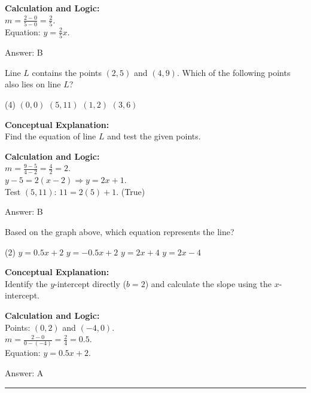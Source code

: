\documentclass[11pt,paper=a4,answers]{exam}
\begin{document}
\begin{questions}
\begin{solution}
\vspace{10pt}
\textbf{Calculation and Logic:} \\
$m = \frac{2 - 0}{5 - 0} = \frac{2}{5}$. \\
Equation: $y = \frac{2}{5}x$.

\vspace{15pt}
Answer: \colorbox{yellow!100}{B}
\end{solution}

\vspace{20pt}

\question
Line $L$ contains the points $(2, 5)$ and $(4, 9)$. Which of the following points also lies on line $L$?
\begin{tasks}(4)
    \task $(0, 0)$
    \task $(5, 11)$
    \task $(1, 2)$
    \task $(3, 6)$
\end{tasks}

\begin{solution}
\textbf{Conceptual Explanation:} \\
Find the equation of line $L$ and test the given points.

\vspace{10pt}
\textbf{Calculation and Logic:} \\
$m = \frac{9 - 5}{4 - 2} = \frac{4}{2} = 2$. \\
$y - 5 = 2(x - 2) \Rightarrow y = 2x + 1$. \\
Test $(5, 11)$: $11 = 2(5) + 1$. (True)

\vspace{15pt}
Answer: \colorbox{yellow!100}{B}
\end{solution}

\vspace{20pt}

\question

Based on the graph above, which equation represents the line?
\begin{tasks}(2)
    \task $y = 0.5x + 2$
    \task $y = -0.5x + 2$
    \task $y = 2x + 4$
    \task $y = 2x - 4$
\end{tasks}

\begin{solution}
\textbf{Conceptual Explanation:} \\
Identify the $y$-intercept directly ($b=2$) and calculate the slope using the $x$-intercept.

\vspace{10pt}
\textbf{Calculation and Logic:} \\
Points: $(0, 2)$ and $(-4, 0)$. \\
$m = \frac{2 - 0}{0 - (-4)} = \frac{2}{4} = 0.5$. \\
Equation: $y = 0.5x + 2$.

\vspace{15pt}
Answer: \colorbox{yellow!100}{A}
\end{solution}

\end{questions}
\begin{center}
\rule{.5\textwidth}{1pt}
\end{center}
\end{document}
